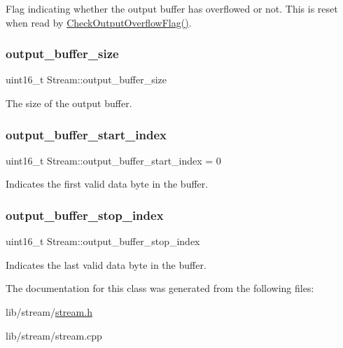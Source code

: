 Flag indicating whether the output buffer has overflowed or not. This is reset when read by \hyperlink{class_stream_aee6c201819b874c5934a270592d9d311}{Check\+Output\+Overflow\+Flag()}. \hypertarget{class_stream_a0e9fd6570bafb97ab76ebd37158e78ff}{}\label{class_stream_a0e9fd6570bafb97ab76ebd37158e78ff} 
\subsubsection{\texorpdfstring{output\+\_\+buffer\+\_\+size}{output\_buffer\_size}}
{\footnotesize\ttfamily uint16\+\_\+t Stream\+::output\+\_\+buffer\+\_\+size\hspace{0.3cm}{\ttfamily [protected]}}

The size of the output buffer. \hypertarget{class_stream_a1b2d63accede402e5c4c7fd3747d4c33}{}\label{class_stream_a1b2d63accede402e5c4c7fd3747d4c33} 
\subsubsection{\texorpdfstring{output\+\_\+buffer\+\_\+start\+\_\+index}{output\_buffer\_start\_index}}
{\footnotesize\ttfamily uint16\+\_\+t Stream\+::output\+\_\+buffer\+\_\+start\+\_\+index = 0\hspace{0.3cm}{\ttfamily [protected]}}

Indicates the first valid data byte in the buffer. \hypertarget{class_stream_a39d177eedd4d5ff28a95cca9131daf4c}{}\label{class_stream_a39d177eedd4d5ff28a95cca9131daf4c} 
\subsubsection{\texorpdfstring{output\+\_\+buffer\+\_\+stop\+\_\+index}{output\_buffer\_stop\_index}}
{\footnotesize\ttfamily uint16\+\_\+t Stream\+::output\+\_\+buffer\+\_\+stop\+\_\+index\hspace{0.3cm}{\ttfamily [protected]}}

Indicates the last valid data byte in the buffer. 

The documentation for this class was generated from the following files\+:\begin{DoxyCompactItemize}
\item 
lib/stream/\hyperlink{stream_8h}{stream.\+h}\item 
lib/stream/stream.\+cpp\end{DoxyCompactItemize}
